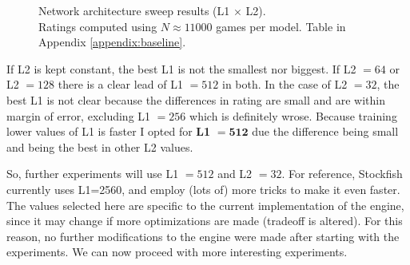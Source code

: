 \begin{figure}[h]
\centering
{}
\captionsetup{justification=centering}
\caption{Network architecture sweep results (L1 $\times$ L2).\\ Ratings computed using $N\approx11000$ games per model. Table in Appendix \ref{appendix:baseline}.}
\label{fig:baseline_heatmaps}
\end{figure}

If L2 is kept constant, the best L1 is not the smallest nor biggest. If L2 $=64$ or L2 $=128$ there is a clear lead of L1 $=512$ in both. In the case of L2 $=32$, the best L1 is not clear because the differences in rating are small and are within margin of error, excluding L1 $=256$ which is definitely wrose. Because training lower values of L1 is faster I opted for \textbf{L1} $\bm{=512}$ due the difference being small and being the best in other L2 values.

So, further experiments will use L1 $=512$ and L2 $=32$. For reference, Stockfish currently uses L1=2560, and employ (lots of) more tricks to make it even faster. The values selected here are specific to the current implementation of the engine, since it may change if more optimizations are made (tradeoff is altered). For this reason, no further modifications to the engine were made after starting with the experiments. We can now proceed with more interesting experiments.
